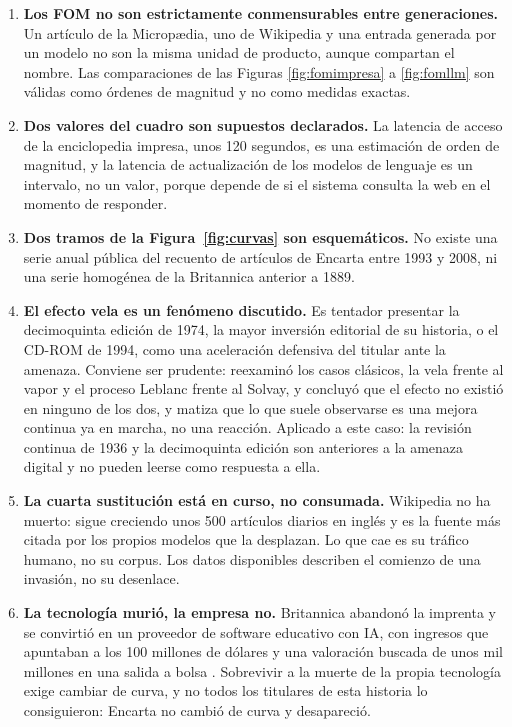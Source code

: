 \documentclass[11pt,letterpaper]{article}
\begin{document}
\begin{enumerate}
  \item \textbf{Los FOM no son estrictamente conmensurables entre
    generaciones.} Un artículo de la Micropædia, uno de Wikipedia y una entrada
    generada por un modelo no son la misma unidad de producto, aunque compartan
    el nombre. Las comparaciones de las Figuras \ref{fig:fomimpresa} a
    \ref{fig:fomllm} son válidas como órdenes de magnitud y no como medidas
    exactas.
  \item \textbf{Dos valores del cuadro son supuestos declarados.} La latencia de
    acceso de la enciclopedia impresa, unos 120 segundos, es una estimación de
    orden de magnitud, y la latencia de actualización de los modelos de lenguaje
    es un intervalo, no un valor, porque depende de si el sistema consulta la web
    en el momento de responder.
  \item \textbf{Dos tramos de la Figura~\ref{fig:curvas} son esquemáticos.} No
    existe una serie anual pública del recuento de artículos de Encarta entre
    1993 y 2008, ni una serie homogénea de la Britannica anterior a 1889.
  \item \textbf{El efecto vela es un fenómeno discutido.} Es tentador presentar
    la decimoquinta edición de 1974, la mayor inversión editorial de su historia,
    o el CD-ROM de 1994, como una aceleración defensiva del titular ante la
    amenaza. Conviene ser prudente: \textcite{howells2002} reexaminó los casos
    clásicos, la vela frente al vapor y el proceso Leblanc frente al Solvay, y
    concluyó que el efecto no existió en ninguno de los dos, y
    \textcite{mendonca2013} matiza que lo que suele observarse es una mejora
    continua ya en marcha, no una reacción. Aplicado a este caso: la revisión
    continua de 1936 y la decimoquinta edición son anteriores a la amenaza
    digital y no pueden leerse como respuesta a ella.
  \item \textbf{La cuarta sustitución está en curso, no consumada.} Wikipedia no
    ha muerto: sigue creciendo unos \num{500} artículos diarios en inglés y es la
    fuente más citada por los propios modelos que la desplazan. Lo que cae es su
    tráfico humano, no su corpus. Los datos disponibles describen el comienzo de
    una invasión, no su desenlace.
  \item \textbf{La tecnología murió, la empresa no.} Britannica abandonó la
    imprenta y se convirtió en un proveedor de software educativo con IA, con
    ingresos que apuntaban a los 100 millones de dólares y una valoración buscada
    de unos mil millones en una salida a bolsa \parencite{bloomberg2024,
    delamerced2024}. Sobrevivir a la muerte de la propia tecnología exige
    cambiar de curva, y no todos los titulares de esta historia lo consiguieron:
    Encarta no cambió de curva y desapareció.
\end{enumerate}
\end{document}
